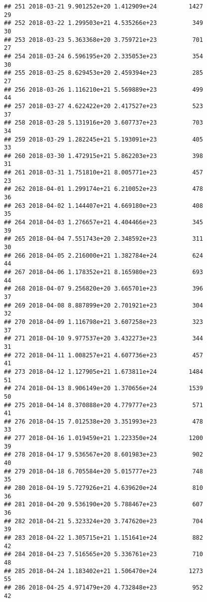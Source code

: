 \documentclass[]{article}
\begin{document}
\begin{verbatim}
## 251 2018-03-21 9.901252e+20 1.412909e+24         1427              29
## 252 2018-03-22 1.299503e+21 4.535266e+23          349              30
## 253 2018-03-23 5.363368e+20 3.759721e+23          701              27
## 254 2018-03-24 6.596195e+20 2.335053e+23          354              30
## 255 2018-03-25 8.629453e+20 2.459394e+23          285              27
## 256 2018-03-26 1.116210e+21 5.569889e+23          499              44
## 257 2018-03-27 4.622422e+20 2.417527e+23          523              37
## 258 2018-03-28 5.131916e+20 3.607737e+23          703              34
## 259 2018-03-29 1.282245e+21 5.193091e+23          405              33
## 260 2018-03-30 1.472915e+21 5.862203e+23          398              31
## 261 2018-03-31 1.751810e+21 8.005771e+23          457              23
## 262 2018-04-01 1.299174e+21 6.210052e+23          478              36
## 263 2018-04-02 1.144407e+21 4.669180e+23          408              35
## 264 2018-04-03 1.276657e+21 4.404466e+23          345              39
## 265 2018-04-04 7.551743e+20 2.348592e+23          311              30
## 266 2018-04-05 2.216000e+21 1.382784e+24          624              44
## 267 2018-04-06 1.178352e+21 8.165980e+23          693              44
## 268 2018-04-07 9.256820e+20 3.665701e+23          396              37
## 269 2018-04-08 8.887899e+20 2.701921e+23          304              32
## 270 2018-04-09 1.116798e+21 3.607258e+23          323              37
## 271 2018-04-10 9.977537e+20 3.432273e+23          344              31
## 272 2018-04-11 1.008257e+21 4.607736e+23          457              41
## 273 2018-04-12 1.127905e+21 1.673811e+24         1484              51
## 274 2018-04-13 8.906149e+20 1.370656e+24         1539              50
## 275 2018-04-14 8.370888e+20 4.779777e+23          571              41
## 276 2018-04-15 7.012538e+20 3.351993e+23          478              33
## 277 2018-04-16 1.019459e+21 1.223350e+24         1200              39
## 278 2018-04-17 9.536567e+20 8.601983e+23          902              40
## 279 2018-04-18 6.705584e+20 5.015777e+23          748              35
## 280 2018-04-19 5.727926e+21 4.639620e+24          810              36
## 281 2018-04-20 9.536190e+20 5.788467e+23          607              36
## 282 2018-04-21 5.323324e+20 3.747620e+23          704              39
## 283 2018-04-22 1.305715e+21 1.151641e+24          882              42
## 284 2018-04-23 7.516565e+20 5.336761e+23          710              48
## 285 2018-04-24 1.183402e+21 1.506470e+24         1273              55
## 286 2018-04-25 4.971479e+20 4.732848e+23          952              42

\end{verbatim}
\end{document}
